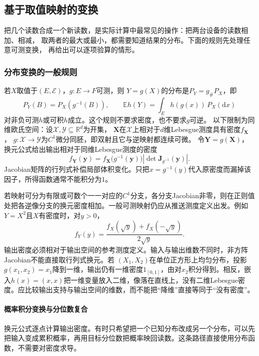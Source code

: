 \subsection{基于取值映射的变换}
把几个读数合成一个新读数，是实际计算中最常见的操作：把两台设备的读数相加、相减，
取两者的最大或最小，都需要知道结果的分布。下面的规则先处理任意可测变换，
再给出可以逐项验算的情形。

\subsubsection{分布变换的一般规则}
\label{sec:rv-pushforward}
若\(X\)取值于\((E,\mathcal E)\)，\(g:E\to F\)可测，则
\(Y=g(X)\)的分布是\(P_Y=g_\#P_X\)，即
\[
P_Y(B)=P_X(g^{-1}(B)),\qquad
\mathbb E h(Y)=\int_E h(g(x))\,P_X(\mathrm dx)
\]
对非负可测\(h\)或可积\(h\)成立。这个规则不要求密度，也不要求\(g\)可逆。
以下限制为同维欧氏空间：设\(\mathcal X,\mathcal Y\subseteq\mathbb R^d\)为开集，
\(\bm X\)在\(\mathcal X\)上相对于\(d\)维Lebesgue测度具有密度\(f_{\bm X}\)，
\(g:\mathcal X\to\mathcal Y\)为\(C^1\)微分同胚，即双射且它与逆映射都连续可微。
令\(\bm Y=g(\bm X)\)，换元公式给出输出相对于同维Lebesgue测度的密度
\begin{equation}
  f_{\bm{Y}}(\bm{y})
  =
  f_{\bm{X}}\bigl(g^{-1}(\bm{y})\bigr)
  \left|
    \det\bm{J}_{g^{-1}}(\bm{y})
  \right|.
  \label{eq:probability-density-change-variables}
\end{equation}
Jacobian矩阵的行列式补偿局部体积变化。只把\(x=g^{-1}(y)\)代入原密度而漏掉该因子，所得函数通常不能积分为\(1\)。

若映射可分为有限或可数个一一对应的\(C^1\)分支，各分支Jacobian非零，则在正则值处把各逆像分支的换元密度相加。一般可测映射仍应从推送测度定义出发。例如\(Y=X^2\)且\(X\)有密度时，对\(y>0\)，
\[ f_Y(y)
  =\frac{f_X(\sqrt{y})+f_X(-\sqrt{y})}{2\sqrt{y}}. \]
输出密度必须相对于输出空间的参考测度定义。输入与输出维数不同时，非方阵Jacobian不能直接取行列式换元。若
\((X_1,X_2)\)在单位正方形上均匀分布，投影\(g(x_1,x_2)=x_1\)降到一维，输出仍有一维密度\(1_{[0,1]}\)，由对\(x_2\)积分得到。相反，嵌入\(h(x)=(x,x)\)把一维变量放入二维，像落在直线上，没有二维Lebesgue密度。应比较输出支持与输出空间的维数，而不能把“降维”直接等同于“没有密度”。

\paragraph{概率积分变换与分位数复合}
\label{sec:probability-integral-transform}
换元公式逐点计算输出密度。有时只希望把一个已知分布改成另一个分布，可以先把输入变成累积概率，再用目标分位数把概率映回读数。这条路径直接使用分布函数，不需要对密度求导。

